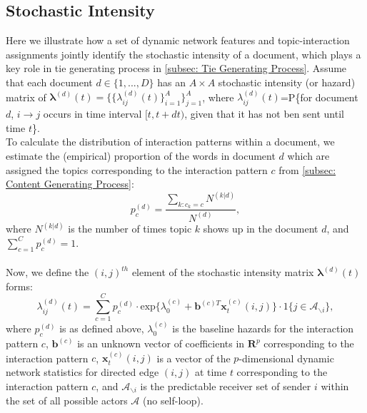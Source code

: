\documentclass[a4paper]{article}
\begin{document}
\subsection{Stochastic Intensity} \label{subsec: Stochastic Intensity}
Here we illustrate how a set of dynamic network features and topic-interaction assignments  jointly identify the stochastic intensity of a document, which plays a key role in tie generating process in \ref{subsec: Tie Generating Process}. Assume that each document $d \in \{1,...,D\}$ has an $A\times A$ stochastic intensity (or hazard) matrix of $\boldsymbol{\lambda}^{(d)}(t) = \{\{\lambda^{(d)}_{ij}(t)\}_{i=1}^{A}\}_{j=1}^{A}$, where $\lambda^{(d)}_{ij}(t)$=P\{for document $d$, $i\rightarrow j$ occurs in time interval $[t, t+dt)$, given that it has not ben sent until time $t$\}. \\ \newline
To calculate the distribution of interaction patterns within a document, we estimate the (empirical) proportion of the words in document $d$ which are assigned the topics corresponding to the interaction pattern $c$ from \ref{subsec: Content Generating Process}: 
\begin{equation}
p_c^{(d)} = \frac{\sum\limits_{k: c_k=c} N^{(k|d)}}{N^{(d)}},
\end{equation}
where $N^{(k|d)}$ is the number of times topic $k$ shows up in the document $d$, and $\sum\limits_{c=1}^{C}p_c^{(d)}=1$.\\\\ \newline
Now, we define the $(i, j)^{th}$ element of the stochastic intensity matrix $\boldsymbol{\lambda}^{(d)}(t)$ forms:
\begin{equation}
\lambda^{(d)}_{ij}(t)=\sum\limits_{c=1}^{C} p^{(d)}_c
\cdot  \mbox{exp}\Big\{\lambda^{(c)}_0 + \boldsymbol{b}^{(c)T}\boldsymbol{x}^{(c)}_t(i, j)\Big\}\cdot 1\{j \in \mathcal{A}_{\backslash i}\},
\end{equation}
where $p_c^{(d)}$ is as defined above, $\lambda^{(c)}_0$ is the baseline hazards for the interaction pattern $c$, $\boldsymbol{b}^{(c)}$ is an unknown vector of coefficients in $\boldsymbol{R}^{p}$ corresponding to the interaction pattern $c$, $\boldsymbol{x}^{(c)}_t(i, j)$ is a vector of the $p$-dimensional dynamic network statistics for directed edge $(i, j)$ at time $t$ corresponding to the interaction pattern $c$, and $\mathcal{A}_{\backslash i}$ is the predictable receiver set of sender $i$ within the set of all possible actors $\mathcal{A}$ (no self-loop). 
\\ \newline
\end{document}
